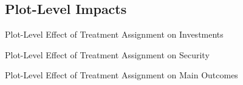 \documentclass[10pt]{article}
\begin{document}
\clearpage
\subsection{Plot-Level Impacts}


\begin{table}[H]
\caption{Plot-Level Effect of Treatment Assignment on Investments}
\begin{center}
\begin{adjustbox}{max width = \textwidth}

\end{adjustbox}
\end{center}
\end{table}


\begin{table}[H]
\caption{Plot-Level Effect of Treatment Assignment on Security}
\begin{center}
\begin{adjustbox}{max width = \textwidth}

\end{adjustbox}
\end{center}
\end{table}

\begin{table}[H]
\caption{Plot-Level Effect of Treatment Assignment on Main Outcomes}
\begin{center}
\begin{adjustbox}{max width = \textwidth}

\end{adjustbox}
\end{center}
\end{table}
\end{document}
